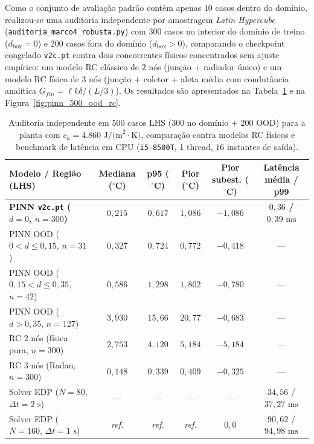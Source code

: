 Como o conjunto de avaliação padrão contém apenas $10$ casos dentro do domínio, realizou-se uma auditoria independente por amostragem \textit{Latin Hypercube} (\texttt{auditoria\_marco4\_robusta.py}) com $300$ casos no interior do domínio de treino ($d_{\mathrm{box}} = 0$) e $200$ casos fora do domínio ($d_{\mathrm{box}} > 0$), comparando o checkpoint congelado \texttt{v2c.pt} contra dois concorrentes físicos concentrados sem ajuste empírico: um modelo RC clássico de $2$ nós (junção + radiador único) e um modelo RC físico de $3$ nós (junção + coletor + aleta média com condutância analítica $G_{fin} = \ell k \delta / (L/3)$). Os resultados são apresentados na Tabela~\ref{tab:auditoria_500_rc} e na Figura~\ref{fig:pinn_500_ood_rc}.

\begin{table}[htbp]
\centering
\small
\caption{Auditoria independente em $500$ casos LHS ($300$ no domínio + $200$ OOD) para a planta com $c_a = 4.860\text{ J/(m}^2\cdot\text{K)}$, comparação contra modelos RC físicos e benchmark de latência em CPU (\texttt{i5-8500T}, 1 thread, $16$ instantes de saída).}
\label{tab:auditoria_500_rc}
\begin{tabularx}{\textwidth}{>{\raggedright\arraybackslash}Xccccc}
\toprule
\textbf{Modelo / Região (LHS)} & \textbf{Mediana ($^\circ$C)} & \textbf{p95 ($^\circ$C)} & \textbf{Pior ($^\circ$C)} & \textbf{Pior subest. ($^\circ$C)} & \textbf{Latência média / p99} \\
\midrule
\textbf{PINN \texttt{v2c.pt} ($d=0$, $n=300$)} & $0{,}215$ & $0{,}617$ & $1{,}086$ & $-1{,}086$ & \textbf{$0{,}36$ / $0{,}39\text{ ms}$} \\
PINN OOD ($0 < d \le 0{,}15$, $n=31$) & $0{,}327$ & $0{,}724$ & $0{,}772$ & $-0{,}418$ & — \\
PINN OOD ($0{,}15 < d \le 0{,}35$, $n=42$) & $0{,}586$ & $1{,}298$ & $1{,}802$ & $-0{,}780$ & — \\
PINN OOD ($d > 0{,}35$, $n=127$) & $3{,}930$ & $15{,}66$ & $20{,}77$ & $-0{,}683$ & — \\
RC 2 nós (física pura, $n=300$) & $2{,}753$ & $4{,}120$ & $5{,}184$ & $-5{,}184$ & — \\
RC 3 nós (Radau, $n=300$) & $0{,}148$ & $0{,}339$ & $0{,}409$ & $-0{,}325$ & — \\
Solver EDP ($N=80$, $\Delta t=2\text{ s}$) & — & — & — & — & $34{,}56$ / $37{,}27\text{ ms}$ \\
Solver EDP ($N=160$, $\Delta t=1\text{ s}$) & \textit{ref.} & \textit{ref.} & \textit{ref.} & $0{,}0$ & $90{,}62$ / $94{,}98\text{ ms}$ \\
\bottomrule
\end{tabularx}
\end{table}

